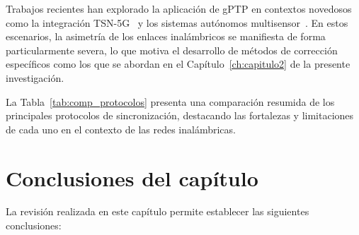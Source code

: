 Trabajos recientes han explorado la aplicación de gPTP en contextos novedosos como la integración TSN-5G~\cite{muslim2025,adil2025} y los sistemas autónomos multisensor~\cite{nagireddy2025}. En estos escenarios, la asimetría de los enlaces inalámbricos se manifiesta de forma particularmente severa, lo que motiva el desarrollo de métodos de corrección específicos como los que se abordan en el Capítulo~\ref{ch:capitulo2} de la presente investigación.

La Tabla~\ref{tab:comp_protocolos} presenta una comparación resumida de los principales protocolos de sincronización, destacando las fortalezas y limitaciones de cada uno en el contexto de las redes inalámbricas.



\section{Conclusiones del capítulo}
\label{sec:1.6}

La revisión realizada en este capítulo permite establecer las siguientes conclusiones:

